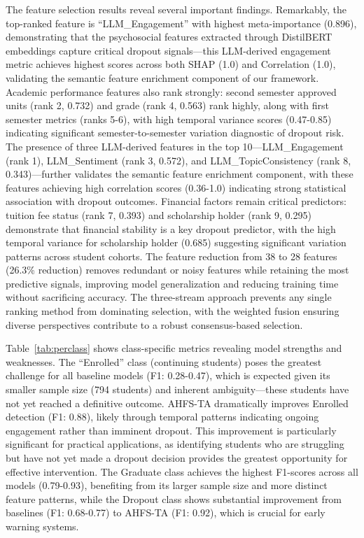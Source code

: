 \documentclass[journal]{IEEEtran}
\begin{document}
The feature selection results reveal several important findings. Remarkably, the top-ranked feature is ``LLM\_Engagement'' with highest meta-importance (0.896), demonstrating that the psychosocial features extracted through DistilBERT embeddings capture critical dropout signals---this LLM-derived engagement metric achieves highest scores across both SHAP (1.0) and Correlation (1.0), validating the semantic feature enrichment component of our framework. Academic performance features also rank strongly: second semester approved units (rank 2, 0.732) and grade (rank 4, 0.563) rank highly, along with first semester metrics (ranks 5-6), with high temporal variance scores (0.47-0.85) indicating significant semester-to-semester variation diagnostic of dropout risk. The presence of three LLM-derived features in the top 10---LLM\_Engagement (rank 1), LLM\_Sentiment (rank 3, 0.572), and LLM\_TopicConsistency (rank 8, 0.343)---further validates the semantic feature enrichment component, with these features achieving high correlation scores (0.36-1.0) indicating strong statistical association with dropout outcomes. Financial factors remain critical predictors: tuition fee status (rank 7, 0.393) and scholarship holder (rank 9, 0.295) demonstrate that financial stability is a key dropout predictor, with the high temporal variance for scholarship holder (0.685) suggesting significant variation patterns across student cohorts. The feature reduction from 38 to 28 features (26.3\% reduction) removes redundant or noisy features while retaining the most predictive signals, improving model generalization and reducing training time without sacrificing accuracy. The three-stream approach prevents any single ranking method from dominating selection, with the weighted fusion ensuring diverse perspectives contribute to a robust consensus-based selection.

Table~\ref{tab:perclass} shows class-specific metrics revealing model strengths and weaknesses. The ``Enrolled'' class (continuing students) poses the greatest challenge for all baseline models (F1: 0.28-0.47), which is expected given its smaller sample size (794 students) and inherent ambiguity---these students have not yet reached a definitive outcome. AHFS-TA dramatically improves Enrolled detection (F1: 0.88), likely through temporal patterns indicating ongoing engagement rather than imminent dropout. This improvement is particularly significant for practical applications, as identifying students who are struggling but have not yet made a dropout decision provides the greatest opportunity for effective intervention. The Graduate class achieves the highest F1-scores across all models (0.79-0.93), benefiting from its larger sample size and more distinct feature patterns, while the Dropout class shows substantial improvement from baselines (F1: 0.68-0.77) to AHFS-TA (F1: 0.92), which is crucial for early warning systems.
\end{document}
